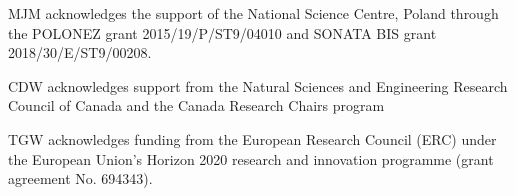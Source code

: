 \documentclass[a4paper,fleqn,usenatbib, twocolumn]{aastex63}
\begin{document}
MJM acknowledges the support of the National Science Centre, Poland through the POLONEZ grant 2015/19/P/ST9/04010 and SONATA BIS grant 2018/30/E/ST9/00208.

CDW acknowledges support from the Natural Sciences and Engineering Research Council of Canada and the Canada Research Chairs program

TGW acknowledges funding from the European Research Council (ERC) under the European Union's Horizon 2020 research and innovation programme (grant agreement No. 694343).





\end{document}
